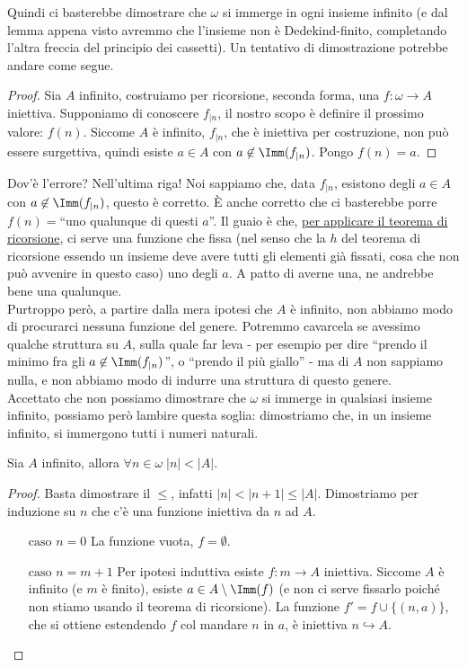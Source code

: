 \documentclass[11pt]{scrartcl}
\begin{document}
Quindi ci basterebbe dimostrare che $\omega$ si immerge in ogni insieme infinito (e dal lemma appena visto avremmo che l'insieme non è Dedekind-finito, completando l'altra freccia del principio dei cassetti).
Un tentativo di dimostrazione potrebbe andare come segue.

\begin{proof}
	Sia $A$ infinito, costruiamo per ricorsione, seconda forma, una $f : \omega \rightarrow A$ iniettiva. Supponiamo di conoscere $f_{|n}$, il nostro scopo è definire il prossimo valore: $f(n)$.
	Siccome $A$ è infinito, $f_{|n}$, che è iniettiva per costruzione, non può essere surgettiva, quindi esiste $a \in A$ con $a \not \in \Imm(f_{|n})$. Pongo $f(n) = a$.
\end{proof}

Dov'è l'errore? Nell'ultima riga! Noi sappiamo che, data $f_{|n}$, esistono degli $a \in A$ con $a \not\in\Imm(f_{|n})$, questo è corretto. È anche corretto che ci basterebbe porre $f(n) =$``uno qualunque di questi $a$''.
Il guaio è che, \underline{per applicare il teorema di ricorsione}, ci serve una funzione che fissa (nel senso che la $h$ del teorema di ricorsione essendo un insieme deve avere tutti gli elementi già fissati, cosa che non può avvenire in questo caso) uno degli $a$. A patto di averne una, ne andrebbe bene una qualunque.\\
Purtroppo però, a partire dalla mera ipotesi che $A$ è infinito, non abbiamo modo di procurarci nessuna funzione del genere. Potremmo cavarcela se avessimo qualche struttura su $A$, sulla quale far leva - per esempio per dire ``prendo il minimo 
fra gli $a \not\in \Imm(f_{|n})$'', o ``prendo il più giallo'' - ma di $A$ non sappiamo nulla, e non abbiamo modo di indurre una struttura di questo genere.\\
Accettato che non possiamo dimostrare che $\omega$ si immerge in qualsiasi insieme infinito, possiamo però lambire questa soglia: dimostriamo che, in un insieme infinito, si immergono tutti i numeri naturali.

\begin{proposition}
	Sia $A$ infinito, allora $\forall n\in \omega \; |n| < |A|$.
\end{proposition}

\begin{proof}
	Basta dimostrare il $\leq$, infatti $|n| < |n+1| \leq |A|$. Dimostriamo per induzione su $n$ che c'è una funzione iniettiva da $n$ ad $A$.
	\begin{itemize}
		\item[$\boxed{\text{caso $n = 0$}}$] La funzione vuota, $f = \emptyset$.
		\item[$\boxed{\text{caso $n = m+1$}}$] Per ipotesi induttiva esiste $f : m \rightarrow A$ iniettiva. Siccome $A$ è infinito (e $m$ è finito), esiste $a \in A \setminus \Imm(f)$ (e non ci serve fissarlo poiché non stiamo usando il teorema di ricorsione).
		La funzione $f' = f \cup \{(n,a)\}$, che si ottiene estendendo $f$ col 
		mandare $n$ in $a$, è iniettiva $n \hookrightarrow A$.
	\end{itemize}
\end{proof}
\end{document}
